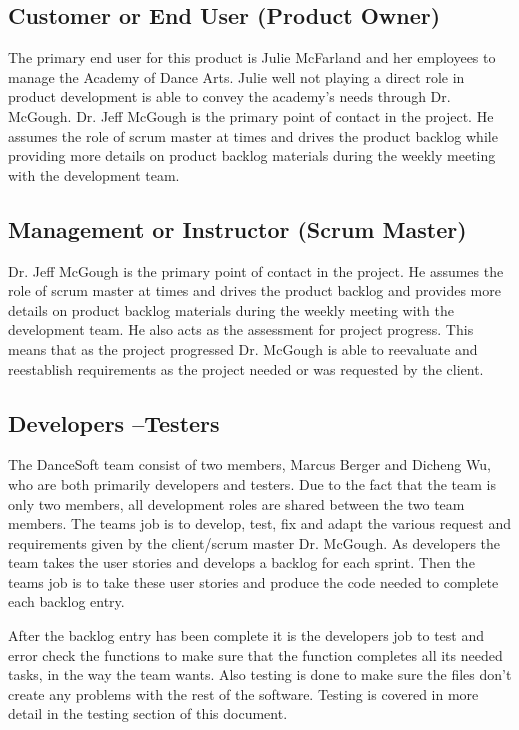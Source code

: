 \subsection{Customer or End User (Product Owner)}
The primary end user for this product is Julie McFarland and her employees to manage the Academy of Dance Arts. Julie well not playing a direct role in product development is able to convey the academy's needs through Dr. McGough. Dr. Jeff McGough is the primary point of contact in the project. He assumes the role of scrum master at times and drives the product backlog while providing more details on product backlog materials during the weekly meeting with the development team. 

\subsection{Management or Instructor (Scrum Master)}
Dr. Jeff McGough is the primary point of contact in the project. He assumes the role of scrum master at times and drives the product backlog and provides more details on product backlog materials during the weekly meeting with the development team. He also acts as the assessment for project progress. This means that as the project progressed Dr. McGough is able to reevaluate and reestablish requirements as the project needed or was requested by the client. 


\subsection{Developers --Testers}
The DanceSoft team consist of two members, Marcus Berger and Dicheng Wu, who are both primarily developers and testers. Due to the fact that the team is only two members, all development roles are shared between the two team members. The teams job is to develop, test, fix and adapt the various request and requirements given by the client/scrum master Dr. McGough. As developers the team takes the user stories and develops a backlog for each sprint. Then the teams job is to take these user stories and produce the code needed to complete each backlog entry.

After the backlog entry has been complete it is the developers job to test and error check the functions to make sure that the function completes all its needed tasks, in the way the team wants. Also testing is done to make sure the files don't create any problems with the rest of the software. Testing is covered in more detail in the testing section of this document.

